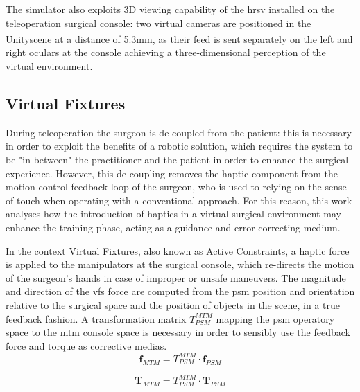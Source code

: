\documentclass{article}
\newcommand{\cright}{\textsuperscript{\textregistered}\phantom{..}}
\newcommand{\vect}[1]{\textbf{#1}}
\begin{document}
\begin{multicols}{2}
The simulator also exploits 3D viewing capability of the \ac{hrsv} installed on the teleoperation surgical console: two virtual cameras are positioned in the Unity\cright scene at a distance of 5.3mm, as their feed is sent separately on the left and right oculars at the console achieving a three-dimensional perception of the virtual environment.
\subsection{Virtual Fixtures}
During teleoperation the surgeon is de-coupled from the patient: this is necessary in order to exploit the benefits of a robotic solution, which requires the system to be "in between" the practitioner and the patient in order to enhance the surgical experience. However, this de-coupling removes the haptic component from the motion control feedback loop of the surgeon, who is used to relying on the sense of touch when operating with a conventional approach. For this reason, this work analyses how the introduction of haptics in a virtual surgical environment may enhance the training phase, acting as a guidance and error-correcting medium. 

In the context Virtual Fixtures, also known as Active Constraints, a haptic force is applied to the manipulators at the surgical console, which re-directs the motion of the surgeon's hands in case of improper or unsafe maneuvers. The magnitude and direction of the \acp{vf} force are computed from the \ac{psm} position and orientation relative to the surgical space and the position of objects in the scene, in a true feedback fashion. A transformation matrix $T_{PSM}^{MTM}$ mapping the \ac{psm} operatory space to the \ac{mtm} console space is necessary in order to sensibly use the feedback force and torque as corrective medias. 
\begin{equation}
  \vect{f}_{MTM} = T_{PSM}^{MTM}\cdot \vect{f}_{PSM}
  \label{eq:forcepsm2mtm}
\end{equation}

\begin{equation}
  \vect{T}_{MTM} = T_{PSM}^{MTM}\cdot \vect{T}_{PSM}
  \label{eq:torquepsm2mtm}
\end{equation}


\end{multicols}
\end{document}
